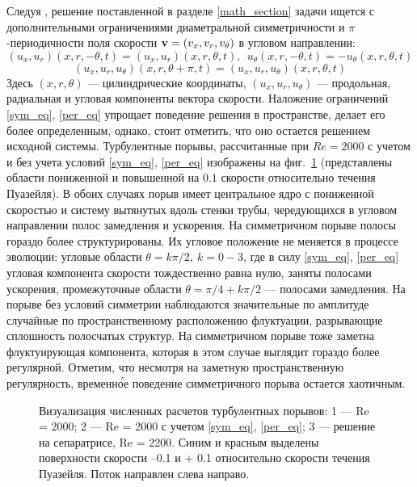 Следуя \cite{Avila2013}, решение поставленной в разделе \ref{math_section} задачи ищется с дополнительными ограничениями диаметральной симметричности и $\pi$-периодичности поля скорости $\mathbf{v} = (v_x, v_r, v_\theta)$ в угловом направлении:
\begin{equation}\label{sym_eq}
(u_x,u_r)(x,r,-\theta,t)=(u_x,u_r)(x,r,\theta,t),\ \ u_\theta(x,r,-\theta,t)=-u_\theta(x,r,\theta,t)
\end{equation}
\begin{equation}\label{per_eq}
(u_x,u_r,u_\theta)(x,r,\theta+\pi,t) = (u_x,u_r,u_\theta)(x,r,\theta,t)
\end{equation}
Здесь $(x, r, \theta)$ --- цилиндрические координаты, $(u_x, u_r, u_\theta)$ --- продольная, радиальная и угловая компоненты вектора скорости. Наложение ограничений \eqref{sym_eq}, \eqref{per_eq} упрощает поведение решения в пространстве, делает его более определенным, однако, стоит отметить, что оно остается решением исходной системы. Турбулентные порывы, рассчитанные при $Re=2000$ с учетом и без учета условий \eqref{sym_eq}, \eqref{per_eq} изображены на фиг.~\ref{3D_img} (представлены области пониженной и повышенной на $0.1$ скорости относительно течения Пуазейля). В обоих случаях порыв имеет центральное ядро с пониженной скоростью и систему вытянутых вдоль стенки трубы, чередующихся в угловом направлении полос замедления и ускорения. На симметричном порыве полосы гораздо более структурированы. Их угловое положение не меняется в процессе эволюции: угловые области $\theta=k\pi/2,\ k=0-3$, где в силу \eqref{sym_eq}, \eqref{per_eq} угловая компонента скорости тождественно равна нулю, заняты полосами ускорения, промежуточные области $\theta=\pi/4+k\pi/2$ --- полосами замедления. На порыве без условий симметрии наблюдаются значительные по амплитуде случайные по пространственному расположению флуктуации, разрывающие сплошность полосчатых структур. На симметричном порыве тоже заметна флуктуирующая компонента, которая в этом случае выглядит гораздо более регулярной. Отметим, что несмотря на заметную пространственную регулярность, временн\'{о}е поведение симметричного порыва остается хаотичным.


\begin{figure}[h]
\caption{Визуализация численных расчетов турбулентных порывов: 1 --- Re = 2000; 2 --- Re = 2000 с учетом \eqref{sym_eq}, \eqref{per_eq}; 3 --- решение на сепаратрисе, Re = 2200. Синим и красным выделены поверхности скорости –0.1 и + 0.1 относительно скорости течения Пуазейля. Поток направлен слева направо.}
\label{3D_img}
\end{figure}

